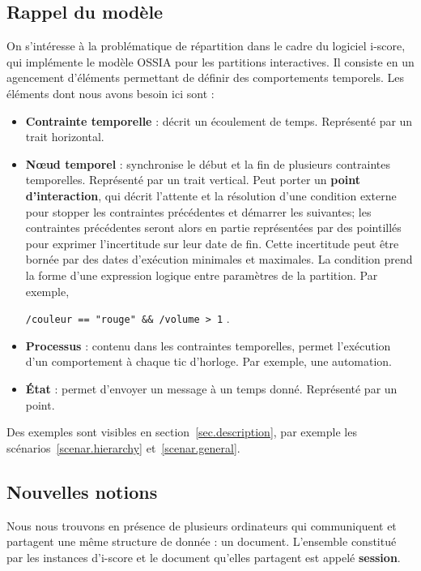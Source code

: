 \documentclass[10pt]{article}
\newcommand\ossia{OSSIA\xspace}
\newcommand\vocab[1]{\textbf{#1}}
\begin{document}
\subsection{Rappel du modèle}
On s'intéresse à la problématique de répartition dans le cadre du logiciel i-score, qui implémente le modèle \ossia\cite{celerier2015ossia} pour les partitions interactives.
Il consiste en un agencement d'éléments permettant de définir des comportements temporels. 
Les éléments dont nous avons besoin ici sont : 
\begin{itemize}
	\item \vocab{Contrainte temporelle} : décrit un écoulement de temps. 
    Représenté par un trait horizontal. 
	\item \vocab{Nœud temporel} : synchronise le début et la fin de plusieurs contraintes temporelles. Représenté par un trait vertical.
	Peut porter un \vocab{point d'interaction}, qui décrit l'attente et la résolution d'une condition externe pour stopper les contraintes précédentes et démarrer les suivantes; les contraintes précédentes seront alors en partie représentées par des pointillés pour exprimer l'incertitude sur leur date de fin. 
    Cette incertitude peut être bornée par des dates d'exécution minimales et maximales.
    La condition prend la forme d'une expression logique entre paramètres de la partition. Par exemple, 
    
    \lstinline|/couleur == "rouge" && /volume > 1| .
	\item \vocab{Processus} : contenu dans les contraintes temporelles, permet l'exécution d'un comportement à chaque tic d'horloge. Par exemple, une automation.
	\item \vocab{État} : permet d'envoyer un message à un temps donné. Représenté par un point.
\end{itemize}
Des exemples sont visibles en section~\ref{sec.description}, par exemple les scénarios~\ref{scenar.hierarchy} et~\ref{scenar.general}.

\subsection{Nouvelles notions}
Nous nous trouvons en présence de plusieurs ordinateurs qui communiquent et partagent une même structure de donnée : un document.
L'ensemble constitué par les instances d'i-score et le document qu'elles partagent est appelé \vocab{session}.
\end{document}
